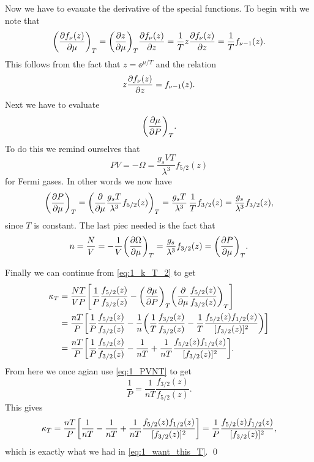 \documentclass[11pt,letter, swedish, english
]{article}
\begin{document}
Now we have to evauate the derivative of the special functions. To
begin with we note that
\begin{equation}
\qty(\pdv{f_\nu(z)}{\mu})_T=\qty(\pdv{z}{\mu})_T\pdv{f_\nu(z)}{z}
= \frac{1}{T}z\pdv{f_\nu(z)}{z}=\frac{1}{T}f_{\nu-1}(z).
\end{equation}
This follows from the fact that $z=\ee^{\mu/T}$ and the relation
\begin{equation}
z\pdv{f_\nu(z)}{z} = f_{\nu-1}(z).
\end{equation}
Next we have to evaluate
\begin{equation}
\qty(\pdv{\mu}{P})_T.
\end{equation}
To do this we remind ourselves that
\begin{equation}
PV=-\Omega=\frac{g_sVT}{\lambda^3}f_{5/2}(z)
\end{equation}
for Fermi gases. In other words we now have
\begin{equation}
\qty(\pdv{P}{\mu})_T 
=\qty(\pdv{\mu} \frac{g_sT}{\lambda^3}f_{5/2}(z))_T 
=\frac{g_sT}{\lambda^3} \,\frac{1}{T}f_{3/2}(z) 
=\frac{g_s}{\lambda^3} f_{3/2}(z),
\end{equation}
since $T$ is constant. 
The last piec needed is the fact that
\begin{equation}
n=\frac{N}{V}=-\frac{1}{V}\qty(\pdv{\Omega}{\mu})_T
=\frac{g_s}{\lambda^3} f_{3/2}(z)=\qty(\pdv{P}{\mu})_T.
\end{equation}

Finally we can continue from \eqref{eq:1_k_T_2} to get
\begin{equation}
\begin{aligned}
\kappa_T &= \frac{NT}{VP} \qty[
\frac{1}{P}\frac{f_{5/2}(z)}{f_{3/2}(z)}
-\qty(\pdv{\mu}{P})_T\qty(\pdv{\mu}\frac{f_{5/2}(z)}{f_{3/2}(z)})_T
]\\
&= \frac{nT}{P} \qty[
\frac{1}{P}\frac{f_{5/2}(z)}{f_{3/2}(z)}
-\frac{1}{n}\qty(\frac{1}{T}\frac{f_{3/2}(z)}{f_{3/2}(z)}
-\frac{1}{T}\frac{f_{5/2}(z)f_{1/2}(z)}{[f_{3/2}(z)]^2}
)]\\
&= \frac{nT}{P} \qty[
\frac{1}{P}\frac{f_{5/2}(z)}{f_{3/2}(z)}
-\frac{1}{nT}
+\frac{1}{nT}\frac{f_{5/2}(z)f_{1/2}(z)}{[f_{3/2}(z)]^2}
].
\end{aligned}
\end{equation}
From here we once agian use \eqref{eq:1_PVNT} to get
\begin{equation}
\frac{1}{P}=\frac{1}{nT}\frac{f_{3/2}(z)}{f_{5/2}(z)}.
\end{equation}
This gives
\begin{equation}
\kappa_T = \frac{nT}{P} \qty[
\frac{1}{nT}
-\frac{1}{nT}
+\frac{1}{nT}\frac{f_{5/2}(z)f_{1/2}(z)}{[f_{3/2}(z)]^2}
]
=\frac{1}{P}\frac{f_{5/2}(z)f_{1/2}(z)}{[f_{3/2}(z)]^2},
\end{equation}
which is exactly what we had in \eqref{eq:1_want_this_T}.
\qed
\end{document}

